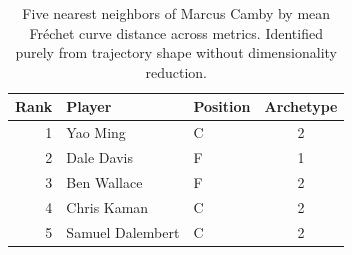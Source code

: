 \begin{table}[htbp]
  \centering\small
  \begin{tabular}{rllc}
    \toprule
    Rank & Player & Position & Archetype \\
    \midrule
    1 & Yao Ming & C & 2 \\
    2 & Dale Davis & F & 1 \\
    3 & Ben Wallace & F & 2 \\
    4 & Chris Kaman & C & 2 \\
    5 & Samuel Dalembert & C & 2 \\
    \bottomrule
  \end{tabular}
  \caption{Five nearest neighbors of Marcus Camby by mean Fr\'{e}chet curve distance across metrics. Identified purely from trajectory shape without dimensionality reduction.}
  \label{tab:Marcus_Camby_frechet_curve_neighbors}
\end{table}

